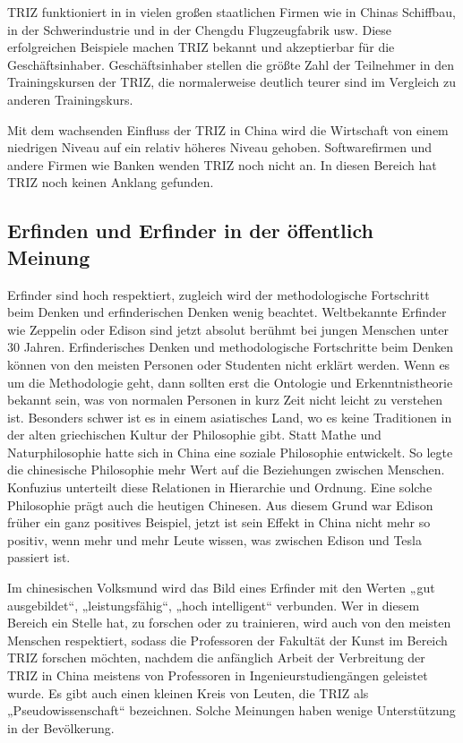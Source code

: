 \documentclass[11pt,a4paper]{article}
\begin{document}
TRIZ funktioniert in in vielen großen staatlichen Firmen wie in Chinas
Schiffbau, in der Schwerindustrie und in der Chengdu Flugzeugfabrik usw.
Diese erfolgreichen Beispiele machen TRIZ bekannt und akzeptierbar für die
Geschäftsinhaber.  Geschäftsinhaber stellen die größte Zahl der Teilnehmer in
den Trainingskursen der TRIZ, die normalerweise deutlich teurer sind im
Vergleich zu anderen Trainingskurs.

Mit dem wachsenden Einfluss der TRIZ in China wird die Wirtschaft von einem
niedrigen Niveau auf ein relativ höheres Niveau gehoben.  Softwarefirmen und
andere Firmen wie Banken wenden TRIZ noch nicht an. In diesen Bereich hat TRIZ
noch keinen Anklang gefunden.

\subsection{Erfinden und Erfinder in der öffentlich Meinung}

Erfinder sind hoch respektiert, zugleich wird der methodologische Fortschritt
beim Denken und erfinderischen Denken wenig beachtet. Weltbekannte Erfinder
wie Zeppelin oder Edison sind jetzt absolut berühmt bei jungen Menschen unter
30 Jahren. Erfinderisches Denken und methodologische Fortschritte beim Denken
können von den meisten Personen oder Studenten nicht erklärt werden. Wenn es
um die Methodologie geht, dann sollten erst die Ontologie und
Erkenntnistheorie bekannt sein, was von normalen Personen in kurz Zeit nicht
leicht zu verstehen ist. Besonders schwer ist es in einem asiatisches Land, wo
es keine Traditionen in der alten griechischen Kultur der Philosophie gibt.
Statt Mathe und Naturphilosophie hatte sich in China eine soziale Philosophie
entwickelt. So legte die chinesische Philosophie mehr Wert auf die Beziehungen
zwischen Menschen. Konfuzius unterteilt diese Relationen in Hierarchie und
Ordnung.  Eine solche Philosophie prägt auch die heutigen Chinesen. Aus diesem
Grund war Edison früher ein ganz positives Beispiel, jetzt ist sein Effekt in
China nicht mehr so positiv, wenn mehr und mehr Leute wissen, was zwischen
Edison und Tesla passiert ist.

Im chinesischen Volksmund wird das Bild eines Erfinder mit den Werten „gut
ausgebildet“, „leistungsfähig“, „hoch intelligent“ verbunden. Wer in diesem
Bereich ein Stelle hat, zu forschen oder zu trainieren, wird auch von den
meisten Menschen respektiert, sodass die Professoren der Fakultät der Kunst im
Bereich TRIZ forschen möchten, nachdem die anfänglich Arbeit der Verbreitung
der TRIZ in China meistens von Professoren in Ingenieurstudiengängen geleistet
wurde. Es gibt auch einen kleinen Kreis von Leuten, die TRIZ als
„Pseudowissenschaft“ bezeichnen.  Solche Meinungen haben wenige Unterstützung
in der Bevölkerung.
\end{document}
